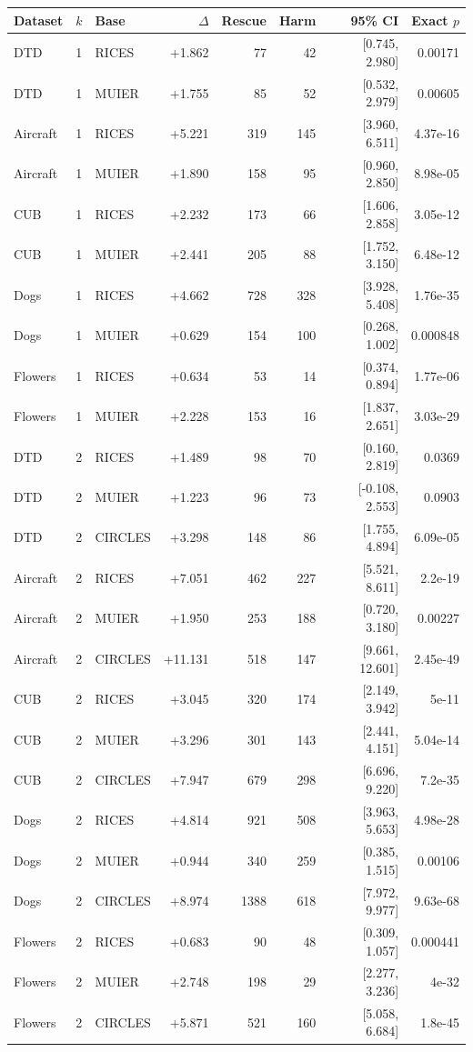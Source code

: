 \begin{tabular}{lllrrrrr}
\toprule
Dataset & $k$ & Base & $\Delta$ & Rescue & Harm & 95\% CI & Exact $p$ \\
\midrule
DTD & 1 & RICES & +1.862 & 77 & 42 & [0.745, 2.980] & 0.00171 \\
DTD & 1 & MUIER & +1.755 & 85 & 52 & [0.532, 2.979] & 0.00605 \\
Aircraft & 1 & RICES & +5.221 & 319 & 145 & [3.960, 6.511] & 4.37e-16 \\
Aircraft & 1 & MUIER & +1.890 & 158 & 95 & [0.960, 2.850] & 8.98e-05 \\
CUB & 1 & RICES & +2.232 & 173 & 66 & [1.606, 2.858] & 3.05e-12 \\
CUB & 1 & MUIER & +2.441 & 205 & 88 & [1.752, 3.150] & 6.48e-12 \\
Dogs & 1 & RICES & +4.662 & 728 & 328 & [3.928, 5.408] & 1.76e-35 \\
Dogs & 1 & MUIER & +0.629 & 154 & 100 & [0.268, 1.002] & 0.000848 \\
Flowers & 1 & RICES & +0.634 & 53 & 14 & [0.374, 0.894] & 1.77e-06 \\
Flowers & 1 & MUIER & +2.228 & 153 & 16 & [1.837, 2.651] & 3.03e-29 \\
DTD & 2 & RICES & +1.489 & 98 & 70 & [0.160, 2.819] & 0.0369 \\
DTD & 2 & MUIER & +1.223 & 96 & 73 & [-0.108, 2.553] & 0.0903 \\
DTD & 2 & CIRCLES & +3.298 & 148 & 86 & [1.755, 4.894] & 6.09e-05 \\
Aircraft & 2 & RICES & +7.051 & 462 & 227 & [5.521, 8.611] & 2.2e-19 \\
Aircraft & 2 & MUIER & +1.950 & 253 & 188 & [0.720, 3.180] & 0.00227 \\
Aircraft & 2 & CIRCLES & +11.131 & 518 & 147 & [9.661, 12.601] & 2.45e-49 \\
CUB & 2 & RICES & +3.045 & 320 & 174 & [2.149, 3.942] & 5e-11 \\
CUB & 2 & MUIER & +3.296 & 301 & 143 & [2.441, 4.151] & 5.04e-14 \\
CUB & 2 & CIRCLES & +7.947 & 679 & 298 & [6.696, 9.220] & 7.2e-35 \\
Dogs & 2 & RICES & +4.814 & 921 & 508 & [3.963, 5.653] & 4.98e-28 \\
Dogs & 2 & MUIER & +0.944 & 340 & 259 & [0.385, 1.515] & 0.00106 \\
Dogs & 2 & CIRCLES & +8.974 & 1388 & 618 & [7.972, 9.977] & 9.63e-68 \\
Flowers & 2 & RICES & +0.683 & 90 & 48 & [0.309, 1.057] & 0.000441 \\
Flowers & 2 & MUIER & +2.748 & 198 & 29 & [2.277, 3.236] & 4e-32 \\
Flowers & 2 & CIRCLES & +5.871 & 521 & 160 & [5.058, 6.684] & 1.8e-45 \\
\bottomrule
\end{tabular}

